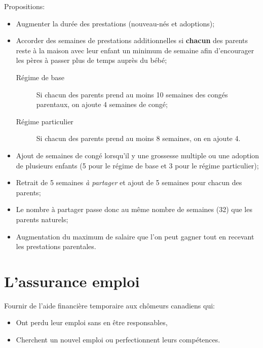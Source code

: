 \documentclass[10pt, french]{article}
\begin{document}
\begin{multicols*}{3}
\begin{definitionNOHFILLsub}
Propositions:
\begin{itemize}[leftmargin = *]
	\item	Augmenter la durée des prestations (nouveau-nés et adoptions);
	\item	Accorder des semaines de prestations additionnelles si \textbf{chacun} des parents reste à la maison avec leur enfant un minimum de semaine afin d'encourager les pères à passer plus de temps auprès du bébé;
		\begin{description}
		\item[Régime de base]	Si chacun des parents prend au moins 10 semaines des congés parentaux, on ajoute 4 semaines de congé;
		\item[Régime particulier]	Si chacun des parents prend au moins 8 semaines, on en ajoute 4.
		\end{description}
	\item	Ajout de semaines de congé lorsqu'il y une grossesse multiple ou une adoption de plusieurs enfants (5 pour le régime de base et 3 pour le régime particulier);
	\item	Retrait de 5 semaines \textit{à partager} et ajout de 5 semaines pour chacun des parents;
	\item	Le nombre à partager passe donc au même nombre de semaines (32) que les parents naturels;
	\item	Augmentation du maximum de salaire que l'on peut gagner tout en recevant les prestations parentales.
\end{itemize}
\end{definitionNOHFILLsub}



\newpage
\section{L’assurance emploi}

\begin{definitionNOHFILLsub}[Objectifs]
Fournir de l'aide financière temporaire aux chômeurs canadiens qui:
\begin{itemize}[leftmargin = *]
	\item	Ont perdu leur emploi sans en être responsables,
	\item	Cherchent un nouvel emploi ou perfectionnent leurs compétences.
\end{itemize}


\end{definitionNOHFILLsub}
\end{multicols*}
\end{document}
